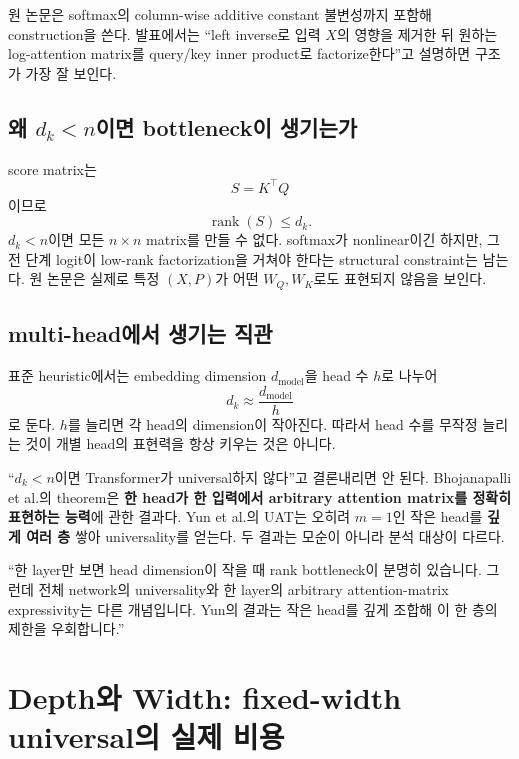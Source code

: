 \documentclass[11pt,a4paper,oneside,openany]{memoir}
\newcommand{\rank}{\operatorname{rank}}
\theoremstyle{definition}
\begin{document}
\begin{suppbox}
원 논문은 softmax의 column-wise additive constant 불변성까지 포함해 construction을 쓴다.
발표에서는 ``left inverse로 입력 $X$의 영향을 제거한 뒤 원하는 log-attention matrix를 query/key inner product로 factorize한다''고 설명하면 구조가 가장 잘 보인다.
\end{suppbox}

\section{왜 \texorpdfstring{$d_k<n$}{dk<n}이면 bottleneck이 생기는가}

score matrix는
\[
S=K^\top Q
\]
이므로
\[
\rank(S)\le d_k.
\]
$d_k<n$이면 모든 $n\times n$ matrix를 만들 수 없다. softmax가 nonlinear이긴 하지만,
그 전 단계 logit이 low-rank factorization을 거쳐야 한다는 structural constraint는 남는다.
원 논문은 실제로 특정 $(X,P)$가 어떤 $W_Q,W_K$로도 표현되지 않음을 보인다.

\section{multi-head에서 생기는 직관}

표준 heuristic에서는 embedding dimension $d_{\mathrm{model}}$을 head 수 $h$로 나누어
\[
d_k\approx \frac{d_{\mathrm{model}}}{h}
\]
로 둔다. $h$를 늘리면 각 head의 dimension이 작아진다.
따라서 head 수를 무작정 늘리는 것이 개별 head의 표현력을 항상 키우는 것은 아니다.

\begin{warningbox}
``$d_k<n$이면 Transformer가 universal하지 않다''고 결론내리면 안 된다.
Bhojanapalli et al.의 theorem은 \textbf{한 head가 한 입력에서 arbitrary attention matrix를 정확히 표현하는 능력}에 관한 결과다.
Yun et al.의 UAT는 오히려 $m=1$인 작은 head를 \textbf{깊게 여러 층} 쌓아 universality를 얻는다.
두 결과는 모순이 아니라 분석 대상이 다르다.
\end{warningbox}

\begin{presentbox}
``한 layer만 보면 head dimension이 작을 때 rank bottleneck이 분명히 있습니다. 그런데 전체 network의 universality와 한 layer의 arbitrary attention-matrix expressivity는 다른 개념입니다. Yun의 결과는 작은 head를 깊게 조합해 이 한 층의 제한을 우회합니다.''
\end{presentbox}

\chapter{Depth와 Width: fixed-width universal의 실제 비용}
\end{document}
